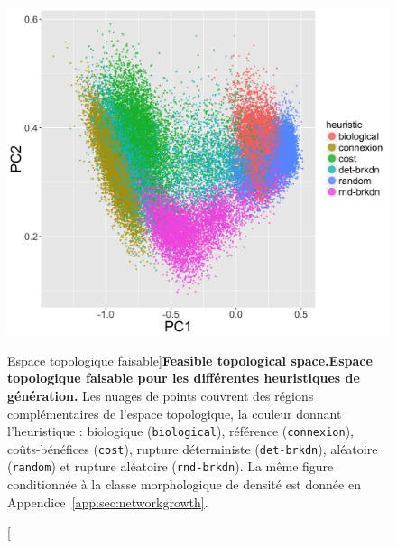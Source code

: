 \begin{figure}
\includegraphics[width=\linewidth]{Figures/Final/7-1-2-fig-networkgrowth-feasiblespace.jpg}
\caption[Feasible topological space][Espace topologique faisable]{\textbf{Feasible topological space.}\label{fig:networkgrowth:feasiblespace}}{\textbf{Espace topologique faisable pour les différentes heuristiques de génération.} Les nuages de points couvrent des régions complémentaires de l'espace topologique, la couleur donnant l'heuristique : biologique (\texttt{biological}), référence (\texttt{connexion}), coûts-bénéfices (\texttt{cost}), rupture déterministe (\texttt{det-brkdn}), aléatoire (\texttt{random}) et rupture aléatoire (\texttt{rnd-brkdn}). La même figure conditionnée à la classe morphologique de densité est donnée en Appendice~\ref{app:sec:networkgrowth}.\label{fig:networkgrowth:feasiblespace}}
\end{figure}

%



